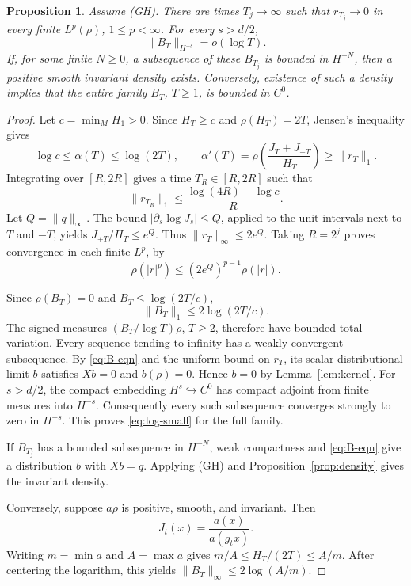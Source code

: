 \documentclass[11pt]{article}
\newtheorem{proposition}[theorem]{Proposition}
\theoremstyle{definition}
\theoremstyle{remark}
\begin{document}
\begin{proposition}\label{prop:jacobians}
Assume (GH). There are times $T_j\to\infty$ such that $r_{T_j}\to0$ in every finite $L^p(\rho)$, $1\le p<\infty$. For every $s>d/2$,
\begin{equation}\label{eq:log-small}
 \|B_T\|_{H^{-s}}=o(\log T).
\end{equation}
If, for some finite $N\ge0$, a subsequence of these $B_{T_j}$ is bounded in $H^{-N}$, then a positive smooth invariant density exists. Conversely, existence of such a density implies that the entire family $B_T$, $T\ge1$, is bounded in $C^0$.
\end{proposition}
\begin{proof}
Let $c=\min_M H_1>0$. Since $H_T\ge c$ and $\rho(H_T)=2T$, Jensen's inequality gives
\[
 \log c\le\alpha(T)\le\log(2T),\qquad
 \alpha'(T)=\rho\left(\frac{J_T+J_{-T}}{H_T}\right)
 \ge\|r_T\|_1.
\]
Integrating over $[R,2R]$ gives a time $T_R\in[R,2R]$ such that
\[
 \|r_{T_R}\|_1\le\frac{\log(4R)-\log c}{R}.
\]
Let $Q=\|q\|_\infty$. The bound $|\partial_s\log J_s|\le Q$, applied to the unit intervals next to $T$ and $-T$, yields $J_{\pm T}/H_T\le e^Q$. Thus $\|r_T\|_\infty\le2e^Q$. Taking $R=2^j$ proves convergence in each finite $L^p$, by
\[
 \rho(|r|^p)\le(2e^Q)^{p-1}\rho(|r|).
\]

Since $\rho(B_T)=0$ and $B_T\le\log(2T/c)$,
\[
 \|B_T\|_1\le2\log(2T/c).
\]
The signed measures $(B_T/\log T)\rho$, $T\ge2$, therefore have bounded total variation. Every sequence tending to infinity has a weakly convergent subsequence. By \eqref{eq:B-eqn} and the uniform bound on $r_T$, its scalar distributional limit $b$ satisfies $Xb=0$ and $b(\rho)=0$. Hence $b=0$ by Lemma~\ref{lem:kernel}. For $s>d/2$, the compact embedding $H^s\hookrightarrow C^0$ has compact adjoint from finite measures into $H^{-s}$. Consequently every such subsequence converges strongly to zero in $H^{-s}$. This proves \eqref{eq:log-small} for the full family.

If $B_{T_j}$ has a bounded subsequence in $H^{-N}$, weak compactness and \eqref{eq:B-eqn} give a distribution $b$ with $Xb=q$. Applying (GH) and Proposition~\ref{prop:density} gives the invariant density.

Conversely, suppose $a\rho$ is positive, smooth, and invariant. Then
\[
 J_t(x)=\frac{a(x)}{a(g_tx)}.
\]
Writing $m=\min a$ and $A=\max a$ gives $m/A\le H_T/(2T)\le A/m$. After centering the logarithm, this yields $\|B_T\|_\infty\le2\log(A/m)$.
\end{proof}
\end{document}
